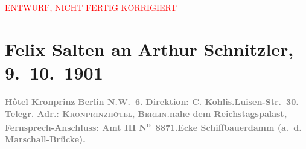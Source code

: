 
\begin{center}
            \textcolor{red}{ENTWURF, NICHT FERTIG KORRIGIERT}
                      \end{center}
            
         
         \renewcommand{\erwaehntePersonen}{Personen: Carl Kohlis, Olga Schnitzler}
         \renewcommand{\erwaehnteInstitutionen}{Institutionen: Jung-Wiener Theater zum Lieben Augustin}
         \renewcommand{\erwaehnteOrte}{Orte: Berlin, Hotel Kronprinz, Luisenstraße, Marschallbrücke, Reichstag, Schiffbauerdamm, Wien}
         \renewcommand{\erwaehnteWerke}{Werke: Die Gedenktafel der Prinzessin Anna, Die Insel. Monatsschrift mit Buchschmuck und Illustrationen, Schlange}
               \section[Felix Salten an Arthur Schnitzler, 9. 10. 1901]{ Felix Salten an Arthur Schnitzler, 9. 10. 1901}\nopagebreak{}\rehead{ }\begin{ledgroupsized}[t]{13cm}\normalsize\beginnumbering \toendnotes[C]{\smallbreak\pagebreak[2]} 
\toendnotes[C]{\smallbreak}\pstart
           \noindent{}\centering{}{\pb}\textcolor{gray}{\textbf{Hôtel Kronprinz}}\pend
           \pstart
           \noindent{}\raggedleft{}\textcolor{gray}{\textbf{Berlin
                        N.W. 6.}}\pend
           \pstart
           \noindent{}\textcolor{gray}{\textbf{Direktion: C.
                           Kohlis.}}\hfill \textcolor{gray}{\textbf{Luisen-Str. 30.}}\pend
           \pstart
           \textcolor{gray}{\textbf{Telegr. Adr.: \textsc{Kronprinzhôtel, Berlin.}}}\hfill \textcolor{gray}{\textbf{nahe dem Reichstagspalast,}}\pend
           \pstart
           \textcolor{gray}{\textbf{Fernsprech-Anschluss: Amt III N\textsuperscript{o} 8871.}}\hfill \textcolor{gray}{\textbf{Ecke Schiffbauerdamm (a. d. Marschall-Brücke).}}\pend

\end{ledgroupsized}
